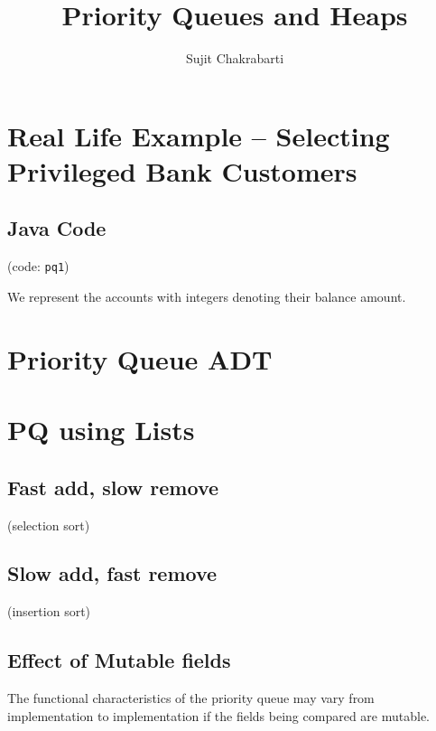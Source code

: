 \documentclass[12pt,a4paper]{article}
\author{Sujit Chakrabarti}
\title{Priority Queues and Heaps}
\date{}
\begin{document}

\newcommand{\highlight}[1]{{\color{Red}(#1)}}
\newcommand{\comment}[1]{{\color{Blue}#1}}


\maketitle

\section{Real Life Example -- Selecting Privileged Bank Customers}

\subsection{Java Code}
(code: \texttt{pq1})

We represent the accounts with integers denoting their balance amount.

\section{Priority Queue ADT}

\section{PQ using Lists}
\subsection{Fast add, slow remove}
(selection sort)
\subsection{Slow add, fast remove}
(insertion sort)

\subsection{Effect of Mutable fields}
The functional characteristics of the priority queue may vary from implementation to implementation if the fields being compared are mutable.
\end{document}
